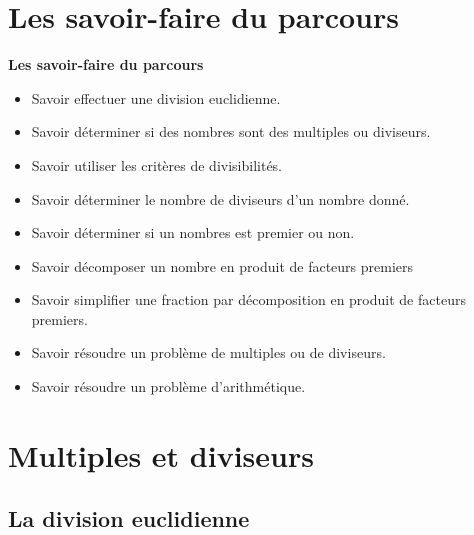 \documentclass[a4paper,dvipsnames]{article}
\begin{document}



\section{Les savoir-faire du parcours}

 \begin{CpsCol}
  \textbf{Les savoir-faire du parcours}
  \begin{itemize}
  \item Savoir effectuer une division euclidienne.
  \item Savoir déterminer si des nombres sont des multiples ou diviseurs.
  \item Savoir utiliser les critères de divisibilités.
  \item Savoir déterminer le nombre de diviseurs d'un nombre donné.
  \item Savoir déterminer si un nombres est premier ou non.
  \item Savoir décomposer un nombre en produit de facteurs premiers
  \item Savoir simplifier une fraction par décomposition en produit de facteurs premiers.
  \item Savoir résoudre un problème de multiples ou de diviseurs.
  \item Savoir résoudre un problème d'arithmétique.
  \end{itemize}
 \end{CpsCol}

\section{Multiples et diviseurs}

\subsection{La division euclidienne}

\end{document}

